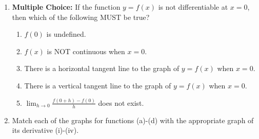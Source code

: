 \documentclass[12pt]{article}
\begin{document}
\begin{enumerate}
\begin{enumerate}
\end{enumerate}

\item {\bf Multiple Choice:} If the function $y=f(x)$ is not differentiable at $x=0$, then which of the following MUST be true?

\begin{enumerate}

\item $f(0)$ is undefined.

\item $f(x)$ is NOT continuous when $x=0$.

\item There is a horizontal tangent line to the graph of $y=f(x)$ when $x=0$.

\item There is a vertical tangent line to the graph of $y=f(x)$ when $x=0$.

\item $\lim_{h\rightarrow 0}\frac{f(0+h)-f(0)}{h}$ does not exist.

\end{enumerate}

\newpage

\item Match each of the graphs for functions (a)-(d) with the appropriate graph of its derivative (i)-(iv).\\


\end{enumerate}
\end{document}
